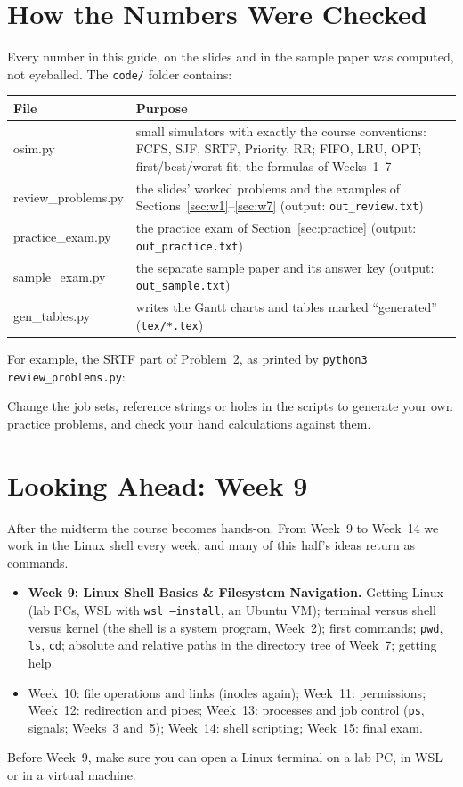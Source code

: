 \documentclass[11pt,a4paper]{article}
\newcommand{\cmd}[1]{\texttt{#1}}
\begin{document}
\section{How the Numbers Were Checked}
\label{sec:check}
Every number in this guide, on the slides and in the sample paper was computed, not eyeballed. The \texttt{code/} folder contains:
\begin{center}
\renewcommand{\arraystretch}{1.2}
\begin{tabularx}{\linewidth}{@{}>{\ttfamily}l X@{}}
\toprule
\textrm{\textbf{File}} & \textbf{Purpose} \\
\midrule
osim.py & small simulators with exactly the course conventions: FCFS, SJF, SRTF, Priority, RR; FIFO, LRU, OPT; first/best/worst-fit; the formulas of Weeks~1--7 \\
review\_problems.py & the slides' worked problems and the examples of Sections~\ref{sec:w1}--\ref{sec:w7} (output: \texttt{out\_review.txt}) \\
practice\_exam.py & the practice exam of Section~\ref{sec:practice} (output: \texttt{out\_practice.txt}) \\
sample\_exam.py & the separate sample paper and its answer key (output: \texttt{out\_sample.txt}) \\
gen\_tables.py & writes the Gantt charts and tables marked ``generated'' (\texttt{tex/*.tex}) \\
\bottomrule
\end{tabularx}
\end{center}
For example, the SRTF part of Problem~2, as printed by \cmd{python3 review\_problems.py}:

Change the job sets, reference strings or holes in the scripts to generate your own practice problems, and check your hand calculations against them.

\section{Looking Ahead: Week 9}
After the midterm the course becomes hands-on. From Week~9 to Week~14 we work in the Linux shell every week, and many of this half's ideas return as commands.
\begin{itemize}
  \item \textbf{Week 9: Linux Shell Basics \& Filesystem Navigation.} Getting Linux (lab PCs, WSL with \cmd{wsl --install}, an Ubuntu VM); terminal versus shell versus kernel (the shell is a system program, Week~2); first commands; \cmd{pwd}, \cmd{ls}, \cmd{cd}; absolute and relative paths in the directory tree of Week~7; getting help.
  \item Week~10: file operations and links (inodes again); Week~11: permissions; Week~12: redirection and pipes; Week~13: processes and job control (\cmd{ps}, signals; Weeks~3 and~5); Week~14: shell scripting; Week~15: final exam.
\end{itemize}
Before Week~9, make sure you can open a Linux terminal on a lab PC, in WSL or in a virtual machine.
\end{document}
